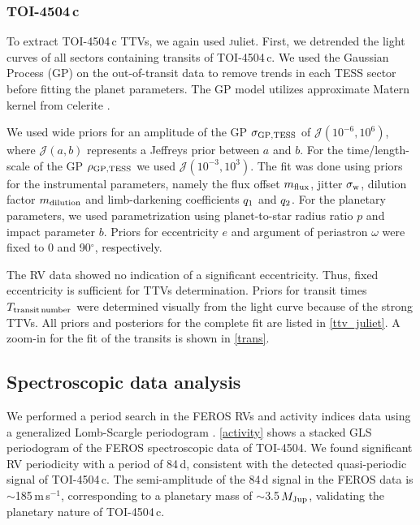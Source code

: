 \documentclass[twocolumn,twocolappendix]{aastex631}
\let\orgautoref\autoref
\renewcommand{\autoref}
        {\def\equationautorefname{Eq.}%
         \def\figureautorefname{Fig.}%
         \def\sectionautorefname{Sect.}%
         \def\subsectionautorefname{Sect.}%
         \def\subsubsectionautorefname{Sect.}%
         \orgautoref}
\begin{document}
\subsubsection{TOI-4504\,c}
\label{sec:4504c}
To extract TOI-4504\,c TTVs, we again used {\textsc juliet}. First, we detrended the light curves of all sectors containing transits of TOI-4504\,c. We used the Gaussian Process (GP) on the out-of-transit data to remove trends in each TESS sector before fitting the planet parameters. The GP model utilizes approximate Matern kernel from {\textsc celerite} \citep{celerite}.




We used wide priors for an amplitude of the GP $\sigma_{\rm{GP,TESS}}$ of $\mathcal{J}(10^{-6},10^{6})$, where $\mathcal{J}(a,b)$ represents a Jeffreys prior between $a$ and $b$. For the time/length-scale of the GP $\rho_{\rm{GP,TESS}}$ we used $\mathcal{J}(10^{-3},10^{3})$. 
The fit was done using priors for the instrumental parameters, namely the flux offset $m_{\rm{flux}}$, jitter $\sigma_{\rm{w}}$, dilution factor $m_{\rm{dilution}}$ and limb-darkening coefficients $q_{\rm{1}}$ and $q_{\rm{2}}$. For the planetary parameters, we used parametrization using planet-to-star radius ratio $p$ and impact parameter $b$. Priors for eccentricity $e$ and argument of periastron $\omega$ were fixed to 0 and 90$^{\circ}$, respectively. 






The RV data showed no indication of a significant eccentricity. Thus, fixed eccentricity is sufficient for TTVs determination. Priors for transit times $T_{\rm transit\,number}$ were determined visually from the light curve because of the strong TTVs. All priors and posteriors for the complete fit are listed in \autoref{ttv_juliet}. A zoom-in for the fit of the transits is shown in \autoref{trans}. %

\subsection{Spectroscopic data analysis}
\label{feros_anaysis}

We performed a period search in the FEROS RVs and activity indices data using a generalized Lomb-Scargle periodogram \citep[GLS;][]{Zechmeister2009}. \autoref{activity} shows a stacked GLS periodogram of the FEROS spectroscopic data of TOI-4504. We found significant RV periodicity with a period of 84\,d, consistent with the detected quasi-periodic signal of TOI-4504\,c. The semi-amplitude of the 
84\,d signal in the FEROS data is $\sim$185\,m\,s$^{-1}$, corresponding to a planetary mass of $\sim$3.5\,$M_{\rm Jup}$, validating the planetary nature of TOI-4504\,c.
\end{document}
